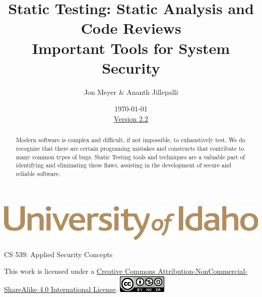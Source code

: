 \documentclass[12pt]{extarticle}
\begin{document}
\title{ Static Testing: Static Analysis and Code Reviews \\ \large Important Tools for System Security}
\author{Jon Meyer \& Ananth Jillepalli}
\date{\today \\ \hyperref[changelog]{Version 2.2}} %
\renewcommand{\abstractname}{Summary}
\begin{titlepage}
\maketitle
{}
\begin{center}
\includegraphics[scale=.5]{UofI}

\large{CS 539: Applied Security Concepts}

\vskip 40pt

\end{center}
\begin{abstract}
Modern software is complex and difficult, if not impossible, to exhaustively test.  We do recognize that there are certain programing mistakes and constructs that contribute to many common types of bugs.  Static Testing tools and techniques are a valuable part of identifying and eliminating these flaws, assisting in the development of secure and reliable software.
\end{abstract}


\vfill
\begin{center}
This work is licensed under a \href{https://creativecommons.org/licenses/by-nc-sa/4.0/legalcode}{Creative Commons Attribution-NonCommercial-ShareAlike 4.0 International License}.
\vskip 10pt
\includegraphics[scale=.5]{cc}
\end{center}

\end{titlepage}


\pagebreak
\tableofcontents


\pagebreak
{}
\setcounter{section}{1}
\end{document}
